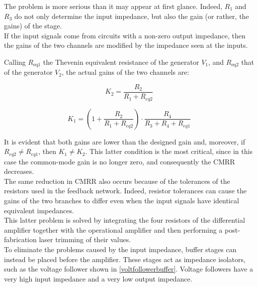 \documentclass[../main.tex]{subfiles}
\begin{document}
The problem is more serious than it may appear at first glance. Indeed, $R_1$ and $R_3$ do not only determine the input impedance, but also the gain (or rather, the gains) of the stage.\\

If the input signals come from circuits with a non-zero output impedance, then the gains of the two channels are modified by the impedance seen at the inputs.

Calling $R_{\mathrm{eq1}}$ the Thevenin equivalent resistance of the generator $V_1$, and $R_{\mathrm{eq2}}$ that of the generator $V_2$, the actual gains of the two channels are:



\begin{equation}
	K_2 = \frac{R_2}{R_1 + R_{eq2}}
\end{equation}

\begin{equation}
	K_1 = \left( 1 + \frac{R_2}{R_1 + R_{eq2}}  \right) \cdot \frac{R_4}{R_3 + R_4 + R_{eq1}}
\end{equation}

It is evident that both gains are lower than the designed gain and, moreover, if $R_{eq2} \neq R_{eq1}$, then $K_1 \neq K_2$. This latter condition is the most critical, since in this case the common-mode gain is no longer zero, and consequently the CMRR decreases.\\

The same reduction in CMRR also occurs because of the tolerances of the resistors used in the feedback network. Indeed, resistor tolerances can cause the gains of the two branches to differ even when the input signals have identical equivalent impedances.\\

This latter problem is solved by integrating the four resistors of the differential amplifier together with the operational amplifier and then performing a post-fabrication laser trimming of their values.\\

To eliminate the problems caused by the input impedance, buffer stages can instead be placed before the amplifier. These stages act as impedance isolators, such as the voltage follower shown in \autoref{voltfollowerbuffer}. Voltage followers have a very high input impedance and a very low output impedance.
\end{document}
